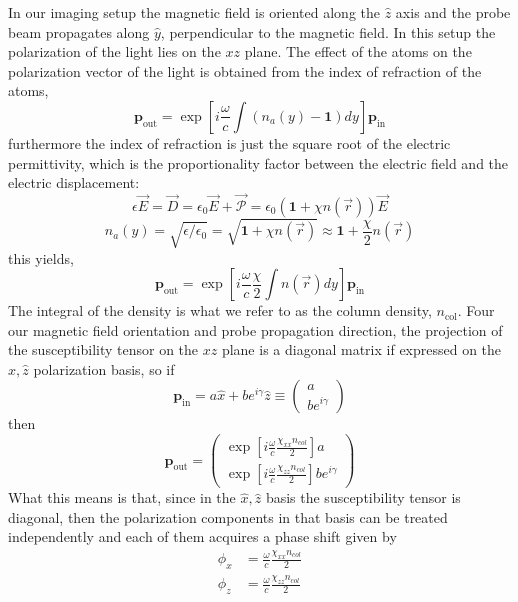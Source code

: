 \documentclass{article}[12pt]
\begin{document}
In our imaging setup the magnetic field is oriented along the $\hat{z}$ axis and the probe beam propagates along $\hat{y}$, perpendicular to the magnetic field.  In this setup the polarization of the light lies on the $xz$ plane.  
The effect of the atoms on the polarization vector of the light is obtained from the index of refraction of the atoms,
\[
  \mathbf{p}_{\mathrm{out}} = \exp\left[ i\frac{\omega }{c}\int (n_{a}(y)-\mathbf{1})dy  \right] \mathbf{p}_{\mathrm{in}} \]
furthermore the index of refraction is just the square root of the electric permittivity, which is the proportionality factor between the electric field and the electric displacement:
\[ \epsilon \vec{E} = \vec{D} = \epsilon_{0}\vec{E} + \vec{\mathcal{P}} = \epsilon_{0}( \mathbf{1} +  \chi n(\vec{r}) )\vec{E}   \]
\[ n_{a}(y) = \sqrt{\epsilon/\epsilon_{0}} = \sqrt{   \mathbf{1} +  \chi n(\vec{r})  } \approx \mathbf{1} + \frac{\chi}{2} n(\vec{r})  \]
this yields,
\[
  \mathbf{p}_{\mathrm{out}} = \exp\left[ i\frac{\omega }{c}\frac{\chi}{2}\int  n(\vec{r})dy  \right]
  \mathbf{p}_{\mathrm{in}} \]
The integral of the density is what we refer to as the column density, $n_{\mathrm{col}}$.   Four our magnetic field orientation and probe propagation direction, the projection of the susceptibility tensor on the $xz$ plane  is a diagonal matrix if expressed on the $\hat{x},\hat{z}$ polarization basis, so if 
\[\mathbf{p}_{\mathrm{in}} = a \hat{x} + b e^{i\gamma} \hat{z} \equiv \left( \begin{array}{c}
a  \\
b e^{i\gamma}    \end{array}   \right)\]
then 
\[
  \mathbf{p}_{\mathrm{out}}  =
    \left( \begin{array}{l}
    \exp\left[ i\frac{\omega }{c}\frac{\chi_{xx}n_{col}}{2}  \right] a  \\
    \exp\left[ i\frac{\omega }{c}\frac{\chi_{zz}n_{col}}{2}  \right]b e^{i\gamma}    \end{array}  \right)
   \]
What this means is that, since in the $\hat{x},\hat{z}$ basis the susceptibility tensor is diagonal, then the polarization components in that basis can be treated independently and each of them acquires a phase shift given by
\begin{align}
\phi_{x} & = \frac{\omega }{c}\frac{\chi_{xx}n_{col}}{2} \\
\phi_{z} & = \frac{\omega }{c}\frac{\chi_{zz}n_{col}}{2} \\
\end{align}
\end{document}
